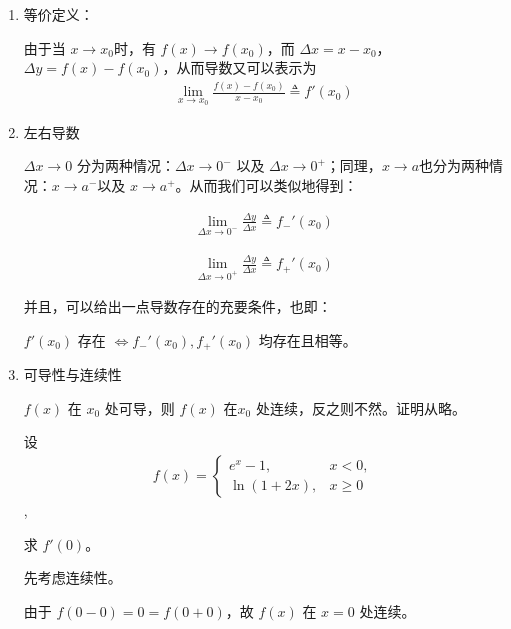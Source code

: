 \begin{note}
    \begin{enumerate}
        \item 等价定义：
        
        由于当 $x \to x_0$时，有 $f(x) \to f(x_0)$，而 $\Delta x =x-x_0$，$\Delta y = f(x)-f(x_0)$，从而导数又可以表示为
        \begin{align}
            \lim_{x \to x_0}\frac{ f(x)-f(x_0)}{x-x_0}\triangleq f'(x_0)
        \end{align}
        \item 左右导数
        
        $\Delta x \to 0$ 分为两种情况：$\Delta x  \to 0^{-}$ 以及
        $\Delta x  \to 0^{+}$；同理，$ x \to a$也分为两种情况：$ x \to a^{-}$以及 $ x \to a^{+}$。从而我们可以类似地得到：

        \begin{align}
            \lim_{\Delta x \to 0^{-}}\frac{\Delta y}{\Delta x} \triangleq f_{-}'(x_0) 
       \end{align}

       \begin{align}
           \lim_{\Delta x \to 0^{+}}\frac{\Delta y}{\Delta x} \triangleq f_{+}'(x_0) 
       \end{align}

        并且，可以给出一点导数存在的充要条件，也即：

        $f'(x_0)$ 存在 $\Leftrightarrow f_{-}'(x_0),f_{+}'(x_0) $ 均存在且相等。

        \item 可导性与连续性
        
        $f(x)$ 在 $x_0$ 处可导，则 $f(x)$ 在$x_0$ 处连续，反之则不然。证明从略。
        \begin{example}
            设 \begin{align*}
                f(x) = \begin{cases}
                e^x-1, & x<0,\\
                \ln(1+2x), & x \ge 0
            \end{cases}
        \end{align*},
            
            求 $f'(0)$。
        \end{example}
        
        \begin{solution}
            先考虑连续性。
        
            由于 $f(0-0)=0=f(0+0)$，故 $f(x)$ 在 $x=0$ 处连续。
        

\end{solution}
\end{enumerate}
\end{note}
